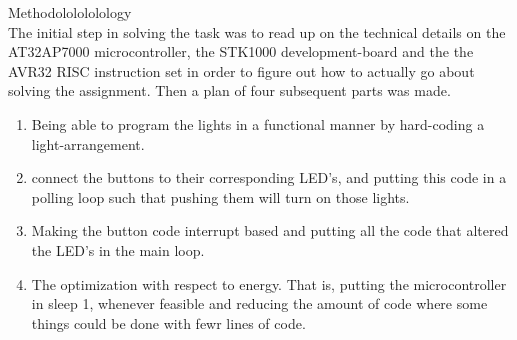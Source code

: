 Methodololololology\\
The initial step in solving the task was to read up on the technical details on the AT32AP7000 microcontroller, the STK1000 development-board and the the AVR32 RISC instruction set in order to figure out how to actually go about solving the assignment. Then a plan of four subsequent parts was made.
\begin{enumerate}
\item{Being able to program the lights in a functional manner by hard-coding a light-arrangement.}
\item{connect the buttons to their corresponding LED's, and putting this code in a polling loop such that pushing them will turn on those lights.}
\item{Making the button code interrupt based and putting all the code that altered the LED's in the main loop.}
\item{The optimization with respect to energy. That is, putting the microcontroller in sleep 1, whenever feasible and reducing the amount of code where some things could be done with fewr lines of code.}
\end{enumerate}
